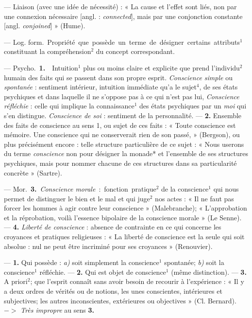 \begin{itemize}[leftmargin=1cm, label=, itemsep=11pt]
 — Liaison (avec une idée
de nécessité) : « La cause et l'effet
sont liés, non par une connexion
nécessaire [angl. : {\it connected}], mais
par une conjonction constante [angl.
{\it conjoined}] » (Hume).

 — \si{Log. form.} Propriété
que possède un terme de désigner
certains attributs$^1$ constituant la
compréhension$^2$ du concept correspondant.

 — \si{Psycho.} {\bf 1.}  Intuition$^1$
plus ou moins claire et explicite
que prend l'individu$^2$ humain des
faits qui se passent dans son propre
esprit. {\it Conscience simple} ou {\it spontanée} : sentiment intérieur, intuition
immédiate qu’a le sujet$^4$, de ses
états psychiques et dans laquelle il
ne s'oppose pas à ce qui n’est pas lui,
{\it Conscience réfléchie} : celle qui implique
la connaissance$^1$ des états psychiques par un {\it moi} qui s’en distingue. {\it Conscience de soi} : sentiment
de la personnalité. —  {\bf 2.} Ensemble
des faits de conscience au sens 1, ou
sujet de ces faits : « Toute conscience
est mémoire. Une conscience qui ne
conserverait rien de son passé, »
(Bergson), ou plus précisément encore : telle structure particulière de
ce sujet : « Nous userons du terme
{\it conscience} non pour désigner la monade* et l’ensemble de ses structures
psychiques, mais pour nommer chacune de ces structures dans sa particularité concrète » (Sartre).

— \si{Mor.} {\bf 3.} {\it Conscience morale} :
fonction pratique$^2$ de la conscience$^1$
qui nous permet de distinguer le
bien et le mal et qui juge$^2$ nos actes :
« Il ne faut pas forcer les hommes à
agir contre leur conscience » (Malebranche); « L’approbation et la
réprobation, voilà l'essence bipolaire de la conscience morale » (Le
Senne). — {\bf 4.} {\it Liberté de conscience} :
absence de contrainte en ce qui
concerne les croyances et pratiques
religieuses : « La liberté de conscience
est la seule qui soit absolue : nul ne
peut être incriminé pour ses croyances » (Renouvier).

 — {\bf 1.}  Qui possède : {\it a)} soit
simplement la conscience$^1$ spontanée; {\it b)} soit la conscience$^1$ réfléchie.
— {\bf 2.}  Qui est objet de conscience$^1$
(même distinction). — {\bf 3.}  A priori$^2$;
que l'esprit connaît sans avoir besoin
de recourir à l’expérience : « Il y a
deux ordres de vérités ou de notions,
les unes conscientes, intérieures et
subjectives; les autres inconscientes,
extérieures ou objectives » (Cl. Bernard). $->$ {\it Très impropre} au
sens {\bf 3.}


\end{itemize}
